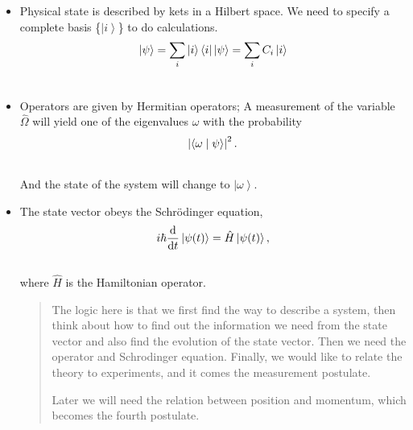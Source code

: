 \documentclass[letterpaper,10pt,english]{sphinxmanual}
\def\d{{\rm d}}
\newcommand{\bra}[1]{\left\langle #1\right|}
\newcommand{\ket}[1]{\left| #1\right\rangle}
\newcommand{\braket}[2]{\langle #1 \mid #2 \rangle}
\begin{document}
\label{QuantumMechanics:first-three-postulates}\begin{itemize}
\item {} 
Physical state is described by kets in a Hilbert space. We need to specify a complete basis \{$\ket{i}$\} to do calculations.
\begin{gather}
\begin{split}\ket{\psi} = \sum_i \ket{i}\bra{i}\ket{\psi} = \sum_i C_i \ket{i}\end{split}\notag\\\begin{split}\end{split}\notag
\end{gather}
\item {} 
Operators are given by Hermitian operators; A measurement of the variable $\hat \Omega$ will yield one of the eigenvalues $\omega$ with the probability
\begin{gather}
\begin{split}\left|\braket{\omega}{\psi}\right|^2 .\end{split}\notag\\\begin{split}\end{split}\notag
\end{gather}
And the state of the system will change to $\ket{\omega}$.

\item {} 
The state vector obeys the Schrödinger equation,
\begin{gather}
\begin{split}i\hbar \frac{\d}{\d t}\ket{\psi(t)} = \hat H \ket{\psi(t)} ,\end{split}\notag\\\begin{split}\end{split}\notag
\end{gather}
where $\hat H$ is the Hamiltonian operator.
\begin{quote}

The logic here is that we first find the way to describe a system, then think about how to find out the information we need from the state vector and also find the evolution of the state vector. Then we need the operator and Schrodinger equation. Finally, we would like to relate the theory to experiments, and it comes the measurement postulate.

Later we will need the relation between position and momentum, which becomes the fourth postulate.
\end{quote}


\end{itemize}
\end{document}
